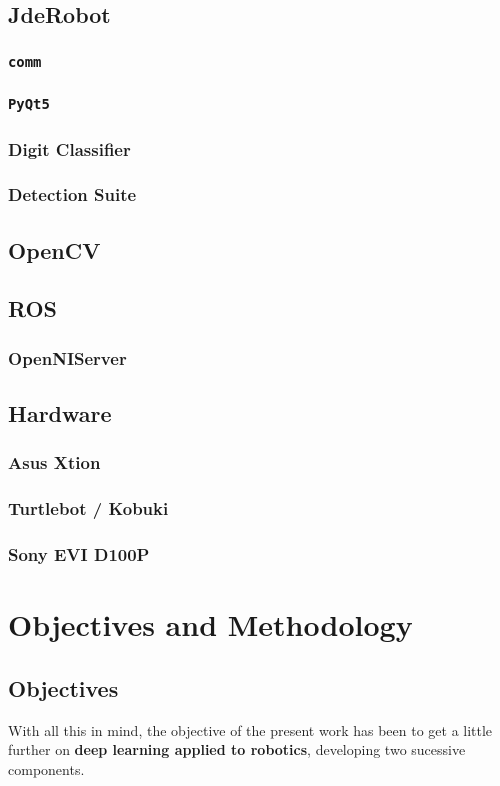 \section{JdeRobot}
\subsection{\texttt{comm}}
\subsection{\texttt{PyQt5}}
\subsection{Digit Classifier}
\subsection{Detection Suite}
\section{OpenCV}
\section{ROS}
\subsection{OpenNIServer}
\section{Hardware}
\subsection{Asus Xtion}
\subsection{Turtlebot / Kobuki}
\subsection{Sony EVI D100P}


\chapter{Objectives and Methodology}

\section{Objectives}
With all this in mind, the objective of the present work has been to get a little further on \textbf{deep learning applied to robotics}, developing two sucessive components.
